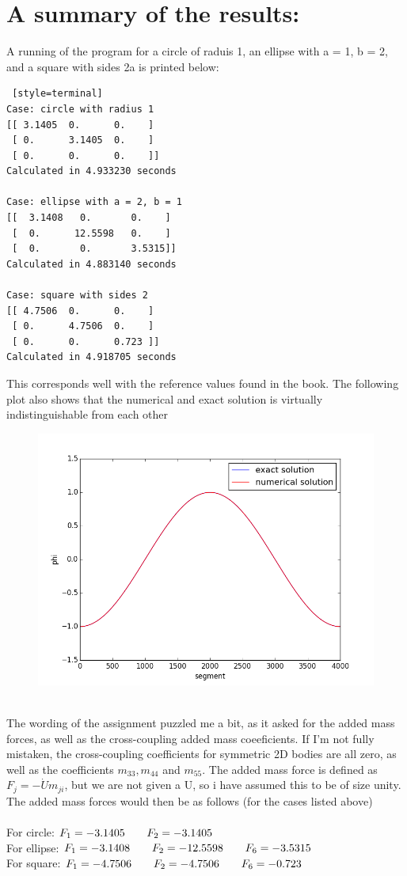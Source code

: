 \documentclass[a4paper,english,11pt,twoside]{article}
\newcommand{\tab}{\hspace*{2em}}
\begin{document}
\section*{A summary of the results:}
A running of the program for a circle of raduis 1, an ellipse with a = 1, b = 2, and a square with sides 2a is printed below:\\
\begin{lstlisting} [style=terminal]
Case: circle with radius 1
[[ 3.1405  0.      0.    ]
 [ 0.      3.1405  0.    ]
 [ 0.      0.      0.    ]]
Calculated in 4.933230 seconds

Case: ellipse with a = 2, b = 1
[[  3.1408   0.       0.    ]
 [  0.      12.5598   0.    ]
 [  0.       0.       3.5315]]
Calculated in 4.883140 seconds

Case: square with sides 2
[[ 4.7506  0.      0.    ]
 [ 0.      4.7506  0.    ]
 [ 0.      0.      0.723 ]]
Calculated in 4.918705 seconds
\end{lstlisting}
This corresponds well with the reference values found in the book. The following plot also shows that the numerical and exact solution is virtually indistinguishable from each other\\
\begin{figure}[h!]
\includegraphics[scale=0.6]{exact_vs_numerical.png}
\end{figure}
\\
\newpage
The wording of the assignment puzzled me a bit, as it asked for the added mass forces, as well as the cross-coupling added mass coeeficients. If I'm not fully mistaken, the cross-coupling coefficients for symmetric 2D bodies are all zero, as well as the coefficients $m_{33}, m_{44}$ and $m_{55}$.  The added mass force is defined as $F_j = -\dot{U}m_{ji}$, but we are not given a U, so i have assumed this to be of size unity. The added mass forces would then be as follows (for the cases listed above)\\
\\
For circle: $F_1 = -3.1405\tab F_2 = -3.1405$\\
For ellipse:  $F_1 = -3.1408\tab F_2 = -12.5598\tab F_6 = -3.5315$\\
For square:  $F_1 = -4.7506\tab F_2 = -4.7506\tab F_6 = -0.723$\\
 
\end{document}
